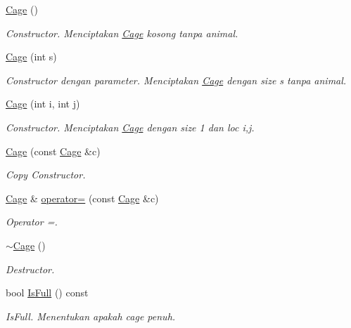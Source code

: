 \begin{DoxyCompactItemize}
\item 
\hyperlink{classCage_ac03246dd263ee9fe6f37336317e62b69}{Cage} ()
\begin{DoxyCompactList}\small\item\em Constructor. Menciptakan \hyperlink{classCage}{Cage} kosong tanpa animal. \end{DoxyCompactList}\item 
\hyperlink{classCage_a8cd728b1eb23303888a153230f96490e}{Cage} (int s)
\begin{DoxyCompactList}\small\item\em Constructor dengan parameter. Menciptakan \hyperlink{classCage}{Cage} dengan size s tanpa animal. \end{DoxyCompactList}\item 
\hyperlink{classCage_a105ec044af346561cc7165f69da8cf08}{Cage} (int i, int j)
\begin{DoxyCompactList}\small\item\em Constructor. Menciptakan \hyperlink{classCage}{Cage} dengan size 1 dan loc i,j. \end{DoxyCompactList}\item 
\hyperlink{classCage_ae85bb53517616422bf7f36282de01519}{Cage} (const \hyperlink{classCage}{Cage} \&c)
\begin{DoxyCompactList}\small\item\em Copy Constructor. \end{DoxyCompactList}\item 
\hyperlink{classCage}{Cage} \& \hyperlink{classCage_a020eefd2b5d15915cf65693413be64db}{operator=} (const \hyperlink{classCage}{Cage} \&c)
\begin{DoxyCompactList}\small\item\em Operator =. \end{DoxyCompactList}\item 
\hyperlink{classCage_a657259499dfc23c63fc65aeaf8abbb17}{$\sim$\+Cage} ()
\begin{DoxyCompactList}\small\item\em Destructor. \end{DoxyCompactList}\item 
bool \hyperlink{classCage_af244dea5f1b3645d3f216a16f353ddc7}{Is\+Full} () const 
\begin{DoxyCompactList}\small\item\em Is\+Full. Menentukan apakah cage penuh. \end{DoxyCompactList}\item 

\end{DoxyCompactItemize}
